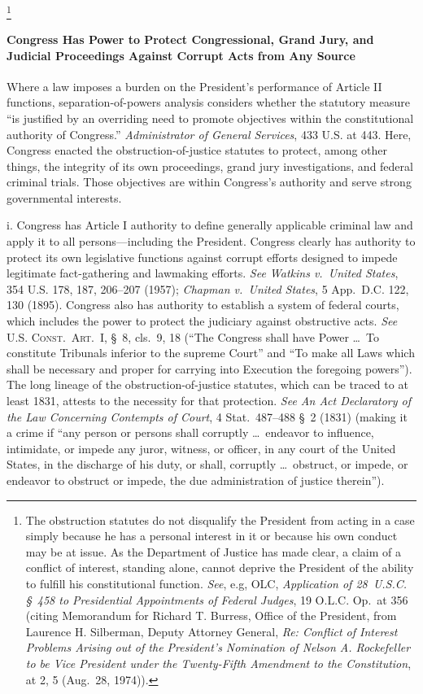 \footnote{The obstruction statutes do not disqualify the President from acting in a case simply because he has a personal interest in it or because his own conduct may be at issue.
As the Department of Justice has made clear, a claim of a conflict of interest, standing alone, cannot deprive the President of the ability to fulfill his constitutional function.
\textit{See}, e.g, OLC, \textit{Application of 28~U.S.C. \S~458 to Presidential Appointments of Federal Judges}, 19 O.L.C. Op.\ at 356 (citing Memorandum for Richard T. Burress, Office of the President, from Laurence H. Silberman, Deputy Attorney General, \textit{Re: Conflict of Interest Problems Arising out of the President's Nomination of Nelson A. Rockefeller to be Vice President under the Twenty-Fifth Amendment to the Constitution}, at 2, 5 (Aug.~28, 1974)).}

\paragraph{Congress Has Power to Protect Congressional, Grand Jury, and Judicial Proceedings Against Corrupt Acts from Any Source}

Where a law imposes a burden on the President's performance of Article II functions, separation-of-powers analysis considers whether the statutory measure ``is justified by an overriding need to promote objectives within the constitutional authority of Congress.''
\textit{Administrator of General Services}, 433 U.S. at 443.
Here, Congress enacted the obstruction-of-justice statutes to protect, among other things, the integrity of its own proceedings, grand jury investigations, and federal criminal trials.
Those objectives are within Congress's authority and serve strong governmental interests.

i. Congress has Article I authority to define generally applicable criminal law and apply it to all persons---including the President.
Congress clearly has authority to protect its own legislative functions against corrupt efforts designed to impede legitimate fact-gathering and lawmaking efforts.
\textit{See Watkins v.\ United States}, 354 U.S. 178, 187, 206--207 (1957);
\textit{Chapman v.\ United States}, 5 App.\ D.C. 122, 130 (1895).
Congress also has authority to establish a system of federal courts, which includes the power to protect the judiciary against obstructive acts.
\textit{See} \textsc{U.S. Const.\ Art.~I}, \S~8, cls.~9, 18 (``The Congress shall have Power \dots\ To constitute Tribunals inferior to the supreme Court'' and ``To make all Laws which shall be necessary and proper for carrying into Execution the foregoing powers'').
The long lineage of the obstruction-of-justice statutes, which can be traced to at least 1831, attests to the necessity for that protection.
\textit{See An Act Declaratory of the Law Concerning Contempts of Court}, 4 Stat.~487--488 \S~2 (1831) (making it a crime if ``any person or persons shall corruptly \dots\ endeavor to influence, intimidate, or impede any juror, witness, or officer, in any court of the United States, in the discharge of his duty, or shall, corruptly \dots\ obstruct, or impede, or endeavor to obstruct or impede, the due administration of justice therein'').

